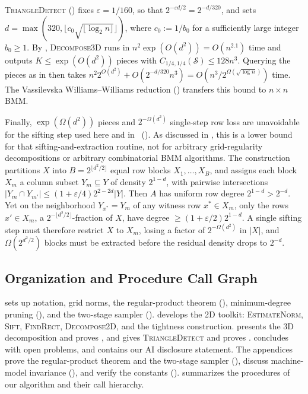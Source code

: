 \documentclass[11pt]{article}
\theoremstyle{definition}
\renewcommand{\label}[1]{}%
\newcommand{\abs}[1]{\left\lvert #1 \right\rvert}
\newcommand{\pot}{C_{1/4,1/4}}
\newcommand{\EstimateNorm}{\textnormal{\textsc{EstimateNorm}}}
\newcommand{\Sift}{\textnormal{\textsc{Sift}}}
\newcommand{\FindRect}{\textnormal{\textsc{FindRect}}}
\newcommand{\DecomposeTwoD}{\textnormal{\textsc{Decompose2D}}}
\newcommand{\DecomposeThreeD}{\textnormal{\textsc{Decompose3D}}}
\newcommand{\TriangleDetect}{\textnormal{\textsc{TriangleDetect}}}
\begin{document}
\TriangleDetect{} () fixes $\varepsilon = 1/160$, so that $2^{-\varepsilon d / 2} = 2^{-d/320}$, and sets $d = \max(320, \lfloor c_0 \sqrt{\lfloor \log_2 n \rfloor} \rfloor)$, where $c_0 := 1/b_0$ for a sufficiently large integer $b_0 \ge 1$. By , \DecomposeThreeD{} runs in $n^2 \exp(O(d^2)) = O(n^{2.1})$ time and outputs $K \le \exp(O(d^2))$ pieces with $\pot(\mathcal{S}) \le 128 n^3$. Querying the pieces as in  then takes $n^2 2^{O(d^2)} + O(2^{-d/320} n^3) = O(n^3 / 2^{\Omega(\sqrt{\log n})})$ time. The Vassilevska Williams--Williams reduction () transfers this bound to $n \times n$ BMM.

Finally, $\exp(\Omega(d^2))$ pieces and $2^{-\Omega(d^2)}$ single-step row loss are unavoidable for the sifting step used here and in~\cite{AFKLM24} (). As discussed in , this is a lower bound for that sifting-and-extraction routine, not for arbitrary grid-regularity decompositions or arbitrary combinatorial BMM algorithms. The construction partitions $X$ into $B = 2^{\lfloor d^2/2 \rfloor}$ equal row blocks $X_1, \dots, X_B$, and assigns each block $X_m$ a column subset $Y_m \subseteq Y$ of density $2^{1-d}$, with pairwise intersections $\abs{Y_m \cap Y_{m'}} \le (1 + \varepsilon/4)2^{2-2d}\abs{Y}$. Then $A$ has uniform row degree $2^{1-d} > 2^{-d}$. Yet on the neighborhood $Y_{x^*} = Y_m$ of any witness row $x^* \in X_m$, only the rows $x' \in X_m$, a $2^{-\lfloor d^2/2 \rfloor}$-fraction of $X$, have degree $\ge (1 + \varepsilon/2)2^{1-d}$. A single sifting step must therefore restrict $X$ to $X_m$, losing a factor of $2^{-\Omega(d^2)}$ in $\abs{X}$, and $\Omega(2^{d^2/2})$ blocks must be extracted before the residual density drops to $2^{-d}$.

\subsection{Organization and Procedure Call Graph}
\label{sec:overview-org}

 sets up notation, grid norms, the regular-product theorem (), minimum-degree pruning (), and the two-stage sampler ().  develops the 2D toolkit: \EstimateNorm{}, \Sift{}, \FindRect{}, \DecomposeTwoD{}, and the tightness construction.  presents the 3D decomposition and proves , and  gives \TriangleDetect{} and proves .  concludes with open problems, and  contains our AI disclosure statement. The appendices prove the regular-product theorem and the two-stage sampler (), discuss machine-model invariance (), and verify the constants ().  summarizes the procedures of our algorithm and their call hierarchy.
\end{document}

